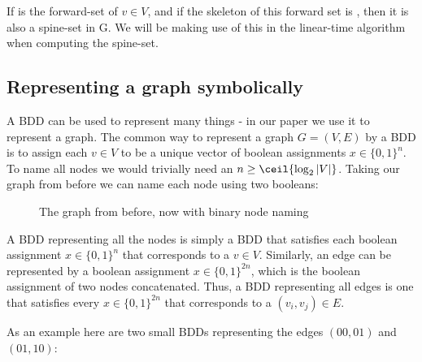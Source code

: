 \documentclass[../master/master.tex]{subfiles}
\begin{document}
If  is the forward-set of $v \in V$, and if the skeleton of this forward set is , then it is also a spine-set in G. We will be making use of this in the linear-time algorithm when computing the spine-set.

\subsection{Representing a graph symbolically}
A BDD can be used to represent many things - in our paper we use it to represent a graph. The common way to represent a graph $G = (V, E)$ by a BDD is to assign each $v\in V$ to be a unique vector of boolean assignments $x\in\{0,1\}^n$. To name all nodes we would trivially need an $n \geq \ceil{\log_2{|V|}}$. Taking our graph from before we can name each node using two booleans:

\begin{figure}[H]
\center
{}
\caption{The graph from before, now with binary node naming}
\label{graphforbdd}
\end{figure}

A BDD representing all the nodes is simply a BDD that satisfies each boolean assignment $x\in\{0,1\}^n$ that corresponds to a $v\in V$. Similarly, an edge can be represented by a boolean assignment $x\in\{0,1\}^{2n}$, which is the boolean assignment of two nodes concatenated. Thus, a BDD representing all edges is one that satisfies every $x\in\{0,1\}^{2n}$ that corresponds to a $(v_i, v_j)\in E$.

As an example here are two small BDDs representing the edges $(00,01)$ and $(01,10)$:
\end{document}

